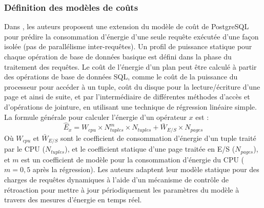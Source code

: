 \subsubsection{Définition des modèles de coûts}
Dans \cite{Xu13, Xu10b}, les auteurs proposent une extension du modèle de coût de PostgreSQL pour prédire la consommation d'énergie d'une seule requête exécutée d'une façon isolée (pas de parallélisme inter-requêtes). Un profil de puissance statique pour chaque opération de base de données basique est défini dans la phase du traitement des requêtes. Le coût de l'énergie d'un plan peut être calculé à partir des opérations de base de données SQL, comme le coût de la puissance du processeur pour accéder à un tuple, coût du disque pour la lecture/écriture d'une page et ainsi de suite, et par l'intermédiaire de différentes méthodes d'accès et d'opérations de jointure, en utilisant une technique de régression linéaire simple. La formule générale pour calculer l'énergie d'un opérateur $x$ est :
\begin{equation}
\hat{E}_x = W_{cpu} \times N_{tuples}^{m} \times N_{tuples} + \bar{W}_{E/S} \times N_{pages}
\end{equation}
Où $W_{cpu}$ et $\bar{W}_{E/S}$ sont le coefficient de consommation d'énergie d'un tuple traité par le CPU ($N_{tuples}$), et le coefficient statique d'une page traitée en E/S ($N_{pages}$), et $m$ est un coefficient de modèle pour la consommation d'énergie du CPU ($m = 0,5$ après la régression).
Les auteurs adaptent leur modèle statique pour des charges de requêtes dynamiques à l'aide d'un mécanisme de contrôle de rétroaction pour mettre à jour périodiquement les paramètres du modèle à travers des mesures d'énergie en temps réel.


